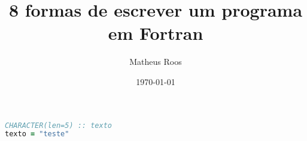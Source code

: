 \documentclass[a4paper,12pt]{extarticle}
\author{Matheus Roos}
\title{8 formas de escrever um programa em Fortran}
\date{\today}
\begin{document}
%
\begin{lstlisting}[language=Fortran]
CHARACTER(len=5) :: texto
texto = "teste"
\end{lstlisting}
 
\end{document}
